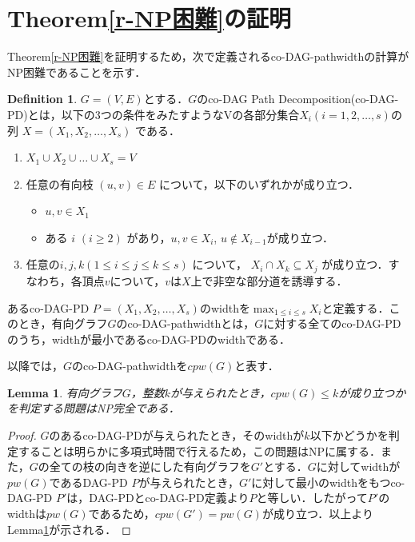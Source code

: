 \documentclass[master]{kuisthesis}		%
\theoremstyle{plain}
\newtheorem{lemma}{Lemma}
\theoremstyle{definition}
\newtheorem{definition*}{Definition}
\begin{document}
\section{Theorem\ref{r-NP困難}の証明}

Theorem\ref{r-NP困難}を証明するため，次で定義されるco-DAG-pathwidthの計算がNP困難であることを示す．

\begin{definition*}
     $G=(V, E)$とする．$G$のco-DAG Path Decomposition(co-DAG-PD)とは，以下の3つの条件をみたすようなVの各部分集合$ X_i (i = 1, 2,  \ldots, s)$の列 $X=(X_1, X_2,  \ldots, X_s)$ である．

    \begin{enumerate}
        \item $ X_1 \cup X_2 \cup \dots \cup X_s = V $ 
        \item 任意の有向枝 $ (u, v) \in E $ について，以下のいずれかが成り立つ．
        \begin{itemize}
            \item $u, v \in X_1$
        \item ある $i$ $(i \geq 2)$ があり，$u, v \in X_i$, $u \notin X_{i-1}$が成り立つ．
        \end{itemize}
        \item 任意の$ i, j, k (1 \leq i \leq j \leq k \leq s)$ について， $X_i \cap X_k \subseteq X_j$ が成り立つ．すなわち，各頂点$v$について，$v$は$X$上で非空な部分道を誘導する．
    \end{enumerate}
    あるco-DAG-PD $P = (X_1, X_2,   \ldots, X_s)$のwidthを$\max_{1 \leq i \leq s} {X_i}$と定義する．このとき，有向グラフ$G$のco-DAG-pathwidthとは，$G$に対する全てのco-DAG-PDのうち，widthが最小であるco-DAG-PDのwidthである．
    
\end{definition*}
 
以降では，$G$のco-DAG-pathwidthを$cpw(G)$と表す．





\begin{lemma}\label{co-DAG-PD}
    有向グラフ$G$，整数$k$が与えられたとき，$cpw(G) \leq k$が成り立つかを判定する問題はNP完全である．
\end{lemma}

\begin{proof}
    $G$のあるco-DAG-PDが与えられたとき，そのwidthが$k$以下かどうかを判定することは明らかに多項式時間で行えるため，この問題はNPに属する．また，$G$の全ての枝の向きを逆にした有向グラフを$G'$とする．$G$に対してwidthが$pw(G)$であるDAG-PD $P$が与えられたとき，$G'$に対して最小のwidthをもつco-DAG-PD $P'$は，DAG-PDとco-DAG-PD定義より$P$と等しい．したがって$P'$のwidthは$pw(G)$であるため，$cpw(G')= pw(G)$が成り立つ．以上よりLemma\ref{co-DAG-PD}が示される．
\end{proof}
\end{document}
